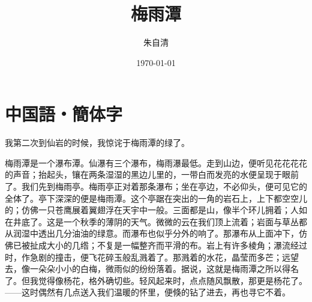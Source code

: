 \documentclass[a5j,12pt]{ltjtarticle}
\title{梅雨潭}
\author{朱自清}
\date{\today}
\begin{document}
\maketitle

\section{中国語・簡体字}

我第二次到仙岩的时候，我惊诧于梅雨潭的绿了。

梅雨潭是一个瀑布潭。仙瀑有三个瀑布，梅雨瀑最低。走到山边，便听见花花花花的声音；抬起头，镶在两条湿湿的黑边儿里的，一带白而发亮的水便呈现于眼前了。我们先到梅雨亭。梅雨亭正对着那条瀑布；坐在亭边，不必仰头，便可见它的全体了。亭下深深的便是梅雨潭。这个亭踞在突出的一角的岩石上，上下都空空儿的；仿佛一只苍鹰展着翼翅浮在天宇中一般。三面都是山，像半个环儿拥着；人如在井底了。这是一个秋季的薄阴的天气。微微的云在我们顶上流着；岩面与草丛都从润湿中透出几分油油的绿意。而瀑布也似乎分外的响了。那瀑布从上面冲下，仿佛已被扯成大小的几绺；不复是一幅整齐而平滑的布。岩上有许多棱角；瀑流经过时，作急剧的撞击，便飞花碎玉般乱溅着了。那溅着的水花，晶莹而多芒；远望去，像一朵朵小小的白梅，微雨似的纷纷落着。据说，这就是梅雨潭之所以得名了。但我觉得像杨花，格外确切些。轻风起来时，点点随风飘散，那更是杨花了。——这时偶然有几点送入我们温暖的怀里，便倏的钻了进去，再也寻它不着。
\end{document}
